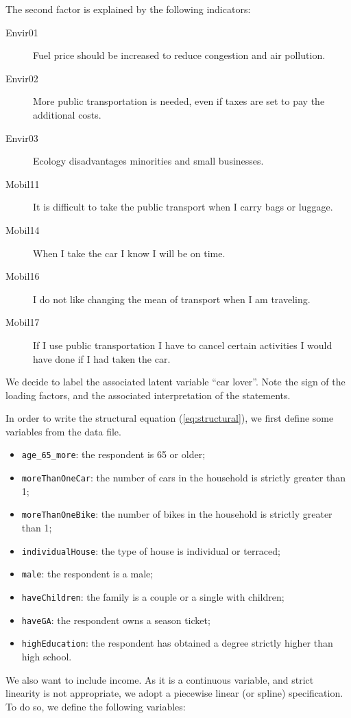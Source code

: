 \documentclass[12pt,a4paper]{article}
\newcommand{\req}[1]{(\ref{#1})}
\begin{document}
The second factor is explained by the following indicators: 
\begin{description}
\item[Envir01] Fuel price should be increased to reduce congestion and air pollution. 
\item[Envir02] More public transportation is needed, even if taxes are set to pay the additional costs.
\item[Envir03] Ecology disadvantages minorities and small businesses.
\item[Mobil11]  It is difficult to take the public transport when I carry bags or luggage.
\item[Mobil14]  When I take the car I know I will be on time.
\item[Mobil16] I do not like changing the mean of transport when I am
  traveling.
\item[Mobil17] If I use public transportation I have to cancel certain activities I would have done if I had taken the car.
\end{description}

We decide to label the associated latent variable ``car lover''. Note
the sign of the loading factors, and the associated interpretation of
the statements. 

In order to write the structural equation \req{eq:structural}, we
first define some variables from the data file. 

\begin{itemize}
\item \lstinline+age_65_more+: the respondent is 65 or older;
\item \lstinline+moreThanOneCar+: the number of cars in the household is
  strictly greater than 1;
\item \lstinline+moreThanOneBike+: the number of bikes in the household is
  strictly greater than 1;
\item \lstinline+individualHouse+: the type of house is individual or terraced;
\item \lstinline+male+: the respondent is a male;
\item \lstinline+haveChildren+: the family is a couple or a single with children;
\item \lstinline+haveGA+: the respondent owns a season ticket;
\item \lstinline+highEducation+: the respondent has obtained a degree
  strictly higher than high school.
\end{itemize}

We also want to include income. As it is a continuous variable, and
strict linearity is not appropriate, we adopt a piecewise linear (or
spline) specification. To do so, we define the following variables:
\end{document}
